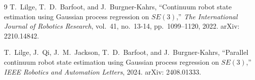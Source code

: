 \documentclass[11pt,a4paper]{article}
\begin{document}
\begin{thebibliography}{9}
T.~Lilge, T.~D.~Barfoot, and J.~Burgner-Kahrs,
``Continuum robot state estimation using Gaussian process regression on $SE(3)$,''
\textit{The International Journal of Robotics Research}, vol.~41, no.~13-14, pp.~1099--1120, 2022.
arXiv: 2210.14842.

T.~Lilge, J.~Qi, J.~M.~Jackson, T.~D.~Barfoot, and J.~Burgner-Kahrs,
``Parallel continuum robot state estimation using Gaussian process regression on $SE(3)$,''
\textit{IEEE Robotics and Automation Letters}, 2024.
arXiv: 2408.01333.
\end{thebibliography}
\end{document}
